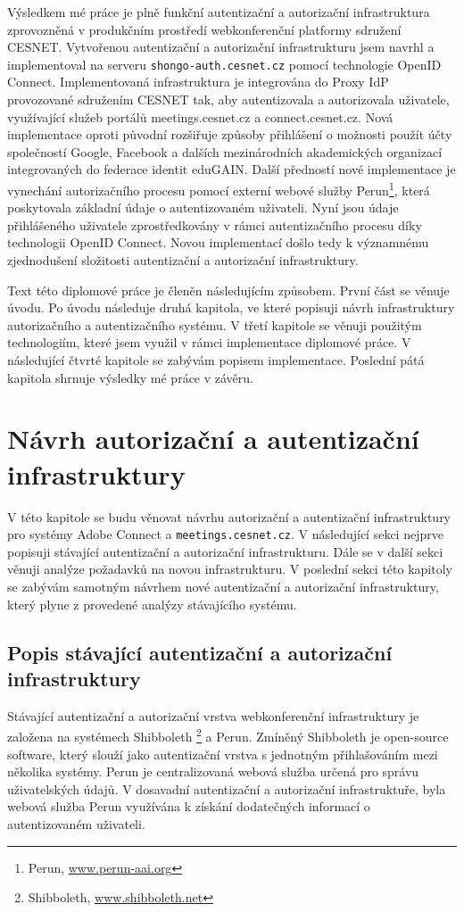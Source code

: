 \documentclass[
  printed, %
  twoside, %
  table,   %
  nolof,     %
  nolot,     %
]{fithesis3}
\begin{document}
Výsledkem mé práce je plně funkční autentizační a autorizační infrastruktura zprovozněná v produkčním prostředí webkonferenční platformy sdružení CESNET. Vytvořenou autentizační a autorizační infrastrukturu jsem navrhl a implementoval na serveru \texttt{shongo-auth.cesnet.cz} pomocí technologie OpenID Connect. Implementovaná infrastruktura je integrována do Proxy IdP provozované sdružením CESNET tak, aby autentizovala a autorizovala uživatele, využívající služeb portálů meetings.cesnet.cz a connect.cesnet.cz. Nová implementace oproti původní rozšiřuje způsoby přihlášení o možnosti použít účty společností Google, Facebook a dalších mezinárodních akademických organizací integrovaných do federace identit eduGAIN. Další předností nové implementace je vynechání autorizačního procesu pomocí externí webové služby Perun\footnote{Perun, \url{www.perun-aai.org}}, která poskytovala základní údaje o autentizovaném uživateli. Nyní jsou údaje přihlášeného uživatele zprostředkovány v rámci autentizačního procesu díky technologii OpenID Connect. Novou implementací došlo tedy k významnému zjednodušení složitosti autentizační a autorizační infrastruktury. \par

Text této diplomové práce je členěn následujícím způsobem. První část se věnuje úvodu. Po úvodu následuje druhá kapitola, ve které popisuji návrh infrastruktury autorizačního a autentizačního systému. V třetí kapitole se věnuji použitým technologiím, které jsem využil v rámci implementace diplomové práce. V následující čtvrté kapitole se zabývám popisem implementace. Poslední pátá kapitola shrnuje výsledky mé práce v závěru. 

\chapter{Návrh autorizační a autentizační infrastruktury}
V této kapitole se budu věnovat návrhu autorizační a autentizační infrastruktury pro systémy Adobe Connect a \texttt{meetings.cesnet.cz}. V následující sekci nejprve popisuji stávající autentizační a autorizační infrastrukturu. Dále se v další sekci věnuji analýze požadavků na novou infrastrukturu. V poslední sekci této kapitoly se zabývám samotným návrhem nové autentizační a autorizační infrastruktury, který plyne z provedené analýzy stávajícího systému.    

\section{Popis stávající autentizační a autorizační infrastruktury}
Stávající autentizační a autorizační vrstva webkonferenční infrastruktury je založena na systémech Shibboleth \footnote{Shibboleth, \url{www.shibboleth.net}} a Perun. Zmíněný Shibboleth je open-source software, který slouží jako autentizační vrstva s jednotným přihlašováním mezi několika systémy. Perun \cite{perunPresentation} je centralizovaná webová služba určená pro správu uživatelských údajů. V dosavadní autentizační a autorizační infrastruktuře, byla webová služba Perun využívána k získání dodatečných informací o autentizovaném uživateli. \par
\end{document}
